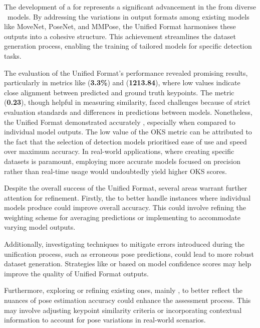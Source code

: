 
The development of a  for  represents a significant advancement in  the  from diverse \NN\ models. By addressing the variations in output formats among existing models like MoveNet, PoseNet, and MMPose, the Unified Format harmonises these outputs into a cohesive structure. This achievement streamlines the dataset generation process, en\-abling the training of tailored models for specific detection tasks.

The evaluation of the Unified Format's performance revealed promising results, particularly in metrics like \pojem{\APE} ({\bf 3.3\%}) and \pojem{\MSE} ({\bf 1213.84}), where low values indicate close alignment between predicted and ground truth keypoints. The \pojem{\OKS} metric ({\bf 0.23}), though helpful in measuring similarity, faced challenges because of strict evaluation standards and differences in predictions between models. Nonetheless, the Unified Format demonstrated  accurately , especially when compared to individual model outputs. The low value of the OKS metric can be attributed to the fact that the selection of detection models prioritised ease of use and speed over maximum accuracy. In real-world applications, where creating specific datasets is paramount, employing more accurate models focused on precision rather than real-time usage would undoubtedly yield higher OKS scores.

Despite the overall success of the Unified Format, several areas warrant further attention for refinement. Firstly,  the  to better handle instances where individual models produce  could improve overall accuracy. This could involve refining the weighting scheme for averaging predictions or implementing  to accommodate varying model outputs.

Additionally, investigating techniques to mitigate errors introduced during the unification process, such as erroneous pose predictions, could lead to more robust dataset generation. Strategies like  or  based on model confidence scores may help improve the quality of Unified Format outputs.

Furthermore, exploring  or refining existing ones, mainly \pojem{\OKS}, to better reflect the nuances of pose estimation accuracy could enhance the assessment process. This may involve adjusting keypoint similarity criteria or incorporating contextual information to account for pose variations in real-world scenarios.


